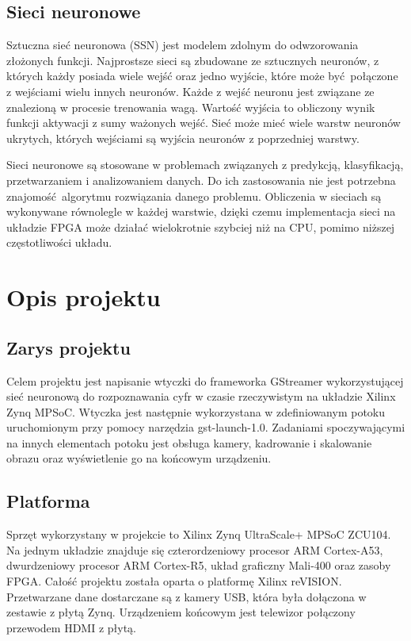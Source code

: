 \documentclass[12pt, oneside]{article}
\begin{document}
\subsection{Sieci neuronowe}
Sztuczna sieć neuronowa (SSN) jest modelem zdolnym do odwzorowania złożonych
funkcji. Najprostsze sieci są zbudowane ze sztucznych neuronów, z których każdy
posiada wiele wejść oraz jedno wyjście, które może być połączone z wejściami
wielu innych neuronów. Każde z wejść neuronu jest związane ze znalezioną
w procesie trenowania wagą. Wartość wyjścia to obliczony wynik funkcji aktywacji
z sumy ważonych wejść. Sieć może mieć wiele warstw neuronów ukrytych, których
wejściami są wyjścia neuronów z poprzedniej warstwy. 

Sieci neuronowe są stosowane  w problemach
związanych z predykcją, klasyfikacją, przetwarzaniem i analizowaniem
danych. Do ich zastosowania nie jest potrzebna znajomość algorytmu rozwiązania
danego problemu. Obliczenia w sieciach są wykonywane równolegle w każdej
warstwie, dzięki czemu implementacja sieci na układzie FPGA może działać
wielokrotnie szybciej niż na CPU, pomimo niższej częstotliwości układu.

\newpage
\section{Opis projektu}

\subsection{Zarys projektu}
Celem projektu jest napisanie wtyczki do frameworka GStreamer
wykorzystującej sieć neuronową do rozpoznawania cyfr w czasie rzeczywistym 
na układzie Xilinx Zynq MPSoC. Wtyczka jest następnie wykorzystana
w zdefiniowanym potoku uruchomionym przy pomocy narzędzia gst-launch-1.0.
Zadaniami spoczywającymi na innych elementach potoku jest obsługa kamery,
kadrowanie i skalowanie obrazu oraz wyświetlenie go na końcowym urządzeniu.

\subsection{Platforma}
Sprzęt wykorzystany w projekcie to Xilinx Zynq UltraScale+ MPSoC ZCU104.
Na jednym układzie znajduje się czterordzeniowy procesor
ARM \mbox{Cortex-A53},
dwurdzeniowy procesor ARM \mbox{Cortex-R5},
układ graficzny \mbox{Mali-400} oraz zasoby FPGA.
Całość projektu została oparta o platformę Xilinx reVISION. Przetwarzane
dane dostarczane są z kamery USB, która była dołączona w zestawie z płytą Zynq.
Urządzeniem końcowym jest telewizor połączony przewodem HDMI z płytą.
\end{document}
